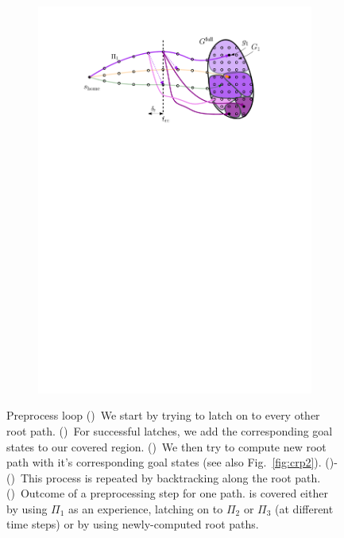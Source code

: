 \documentclass[conference]{IEEEtran}
\begin{document}
\begin{figure}[t]
\begin{subfigure}{0.225\textwidth}
        \includegraphics[width=\textwidth]{3_preprocess_loop_7}
        \caption{}
        \label{fig:pl7}
    \end{subfigure}
    \caption{Preprocess loop
    ()~We start by trying to latch on to every other root path. 
    ()~For successful latches, we add the corresponding goal states to our covered region.
    ()~We then try to compute new root path with it's corresponding goal states (see also Fig.~\ref{fig:crp2}).
    ()-()~This process is repeated by backtracking along the root path.
    ()~Outcome of a preprocessing step for one path. \Gfull is covered either by using $\Pi_1$ as an experience, 
    latching on to $\Pi_2$ or  $\Pi_3$ (at different time steps)
    or by 
    using newly-computed root paths. 
    }
    \label{fig:pl}
\end{figure}
\end{document}
